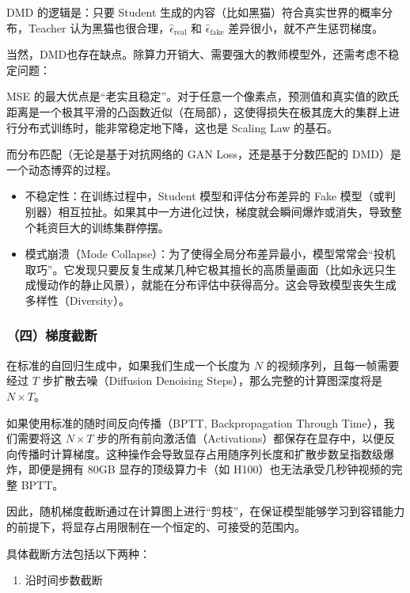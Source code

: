 DMD 的逻辑是：只要 Student 生成的内容（比如黑猫）符合真实世界的概率分布，Teacher 认为黑猫也很合理，\(\hat{\epsilon}_{\mathrm{real}}\) 和 \(\hat{\epsilon}_{\mathrm{fake}}\) 差异很小，就不产生惩罚梯度。

当然，DMD也存在缺点。除算力开销大、需要强大的教师模型外，还需考虑不稳定问题：

MSE 的最大优点是``老实且稳定''。对于任意一个像素点，预测值和真实值的欧氏距离是一个极其平滑的凸函数近似（在局部），这使得损失在极其庞大的集群上进行分布式训练时，能非常稳定地下降，这也是 Scaling Law 的基石。

而分布匹配（无论是基于对抗网络的 GAN Loss，还是基于分数匹配的 DMD）是一个动态博弈的过程。

\begin{itemize}
\tightlist
\item
  不稳定性：在训练过程中，Student 模型和评估分布差异的 Fake 模型（或判别器）相互拉扯。如果其中一方进化过快，梯度就会瞬间爆炸或消失，导致整个耗资巨大的训练集群停摆。
\item
  模式崩溃（Mode Collapse）：为了使得全局分布差异最小，模型常常会``投机取巧''。它发现只要反复生成某几种它极其擅长的高质量画面（比如永远只生成慢动作的静止风景），就能在分布评估中获得高分。这会导致模型丧失生成多样性（Diversity）。
\end{itemize}

\hypertarget{ux56dbux68afux5ea6ux622aux65ad}{%
\subsubsection{（四）梯度截断}\label{ux56dbux68afux5ea6ux622aux65ad}}

在标准的自回归生成中，如果我们生成一个长度为 \(N\) 的视频序列，且每一帧需要经过 \(T\) 步扩散去噪（Diffusion Denoising Steps），那么完整的计算图深度将是 \(N\times T\)。

如果使用标准的随时间反向传播（BPTT, Backpropagation Through Time），我们需要将这 \(N\times T\) 步的所有前向激活值（Activations）都保存在显存中，以便反向传播时计算梯度。这种操作会导致显存占用随序列长度和扩散步数呈指数级爆炸，即便是拥有 80GB 显存的顶级算力卡（如 H100）也无法承受几秒钟视频的完整 BPTT。

因此，随机梯度截断通过在计算图上进行``剪枝''，在保证模型能够学习到容错能力的前提下，将显存占用限制在一个恒定的、可接受的范围内。

具体截断方法包括以下两种：

\begin{enumerate}
\def\labelenumi{\arabic{enumi}.}
\tightlist
\item
  沿时间步数截断
\end{enumerate}

